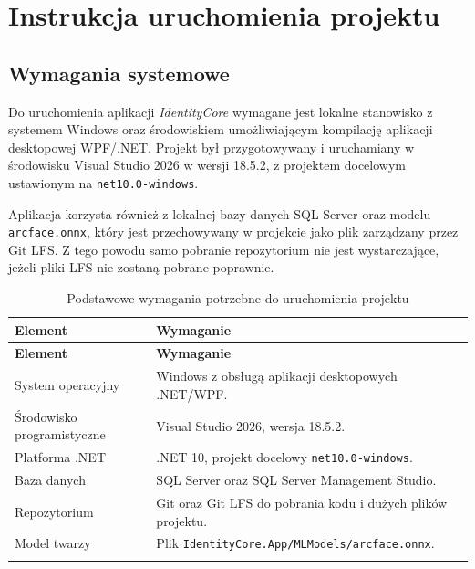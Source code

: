 \chapter{Instrukcja uruchomienia projektu}
\label{chap:instrukcja-uruchomienia}

\section{Wymagania systemowe}

Do uruchomienia aplikacji \textit{IdentityCore} wymagane jest lokalne stanowisko z systemem Windows oraz środowiskiem umożliwiającym kompilację aplikacji desktopowej WPF/.NET. Projekt był przygotowywany i uruchamiany w środowisku Visual Studio 2026 w wersji 18.5.2, z projektem docelowym ustawionym na \texttt{net10.0-windows}.

Aplikacja korzysta również z lokalnej bazy danych SQL Server oraz modelu \texttt{arcface.onnx}, który jest przechowywany w projekcie jako plik zarządzany przez Git LFS. Z tego powodu samo pobranie repozytorium nie jest wystarczające, jeżeli pliki LFS nie zostaną pobrane poprawnie.

\renewcommand{\arraystretch}{1.15}
\begin{xltabular}{\textwidth}{|
    >{\RaggedRight\arraybackslash}p{4.5cm}|
    >{\RaggedRight\arraybackslash}X|}

    \hline
    \textbf{Element} & \textbf{Wymaganie} \\
    \hline
    \endfirsthead

    \hline
    \textbf{Element} & \textbf{Wymaganie} \\
    \hline
    \endhead

    System operacyjny & Windows z obsługą aplikacji desktopowych .NET/WPF. \\
    \hline
    Środowisko programistyczne & Visual Studio 2026, wersja 18.5.2. \\
    \hline
    Platforma .NET & .NET 10, projekt docelowy \texttt{net10.0-windows}. \\
    \hline
    Baza danych & SQL Server oraz SQL Server Management Studio. \\
    \hline
    Repozytorium & Git oraz Git LFS do pobrania kodu i dużych plików projektu. \\
    \hline
    Model twarzy & Plik \texttt{IdentityCore.App/MLModels/arcface.onnx}. \\
    \hline

    \caption{Podstawowe wymagania potrzebne do uruchomienia projektu}
    \label{tab:wymagania-uruchomieniowe}
\end{xltabular}

